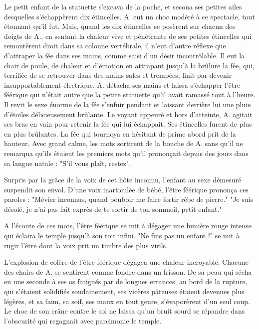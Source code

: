 Le petit enfant de la statuette s'excava de la poche, et secoua ses
petites ailes desquelles s'échappèrent dix étincelles. A. eut un choc
modéré à ce spectacle, tout étonnant qu'il fut. Mais, quand les dix
étincelles se posèrent sur chacun des doigts de A., en sentant la
chaleur vive et pénétrante de ses petites étincelles qui remontèrent
droit dans sa colonne vertébrale, il n'eut d'autre réflexe que
d'attraper la fée dans ses mains, comme saisi d'un désir
incontrôlable. Il eut la chair de poule, de chaleur et d'émotion en
attrapant jusqu'à la brûlure la fée, qui, terrifiée de se retrouver
dans des mains sales et trempées, finit par devenir insupportablement
électrique. A. détacha ses mains et laissa s'échapper l'être féérique
qui n'était autre que la petite statuette qu'il avait ramassé tout à
l'heure. Il revit le sexe énorme de la fée s'enfuir pendant et
laissant derrière lui une pluie d'étoiles délicieusement brûlante. Le
voyant appeuré et hors d'atteinte, A. agitait ses bras en vain pour
retenir la fée qui lui échappait. Ses étincelles furent de plus en
plus brûlantes. La fée qui tournoya en hésitant de prime abord prit de
la hauteur. Avec grand calme, les mots sortirent de la bouche de
A. sans qu'il ne remarqua qu'ils étaient les premiers mots qu'il
prononçait depuis des jours dans sa langue natale : "S'il vous plaît, restez".


Surpris par la grâce de la voix de cet hôte inconnu, l'enfant au sexe
démesuré suspendit son envol. D'une voix inarticulée de bébé, l'être
féérique prononça ces paroles : "Mévier inconnus, quand pouboir me
faire fortir rêbe de pierre."  "Je suis désolé, je n'ai pas fait
exprès de te sortir de ton sommeil, petit enfant."

A l'écoute de ces mots, l'être féérique se mit à dégager une lumière
rouge intense qui éclaira le temple jusqu'à son toit infini. "Ne fuis
pas un enfant !" se mit à rugir l'être dont la voix prit un timbre des
plus virils.

L'explosion de colère de l'être féérique dégagea une chaleur
incroyable. Chacune des chairs de A. se sentirent comme fondre dans un
frisson. De sa peau qui sécha en une seconde à ses os fatigués par de
longues errances, au bord de la rupture, qui s'étaient solidifiés
soudainement, ses vicères pâteuses étaient devenues plus légères, et
sa faim, sa soif, ses maux en tout genre, s'évaporèrent d'un seul
coup. Le choc de son crâne contre le sol ne laissa qu'un bruit sourd
se répandre dans l'obscurité qui regagnait avec parcimonie le temple.

